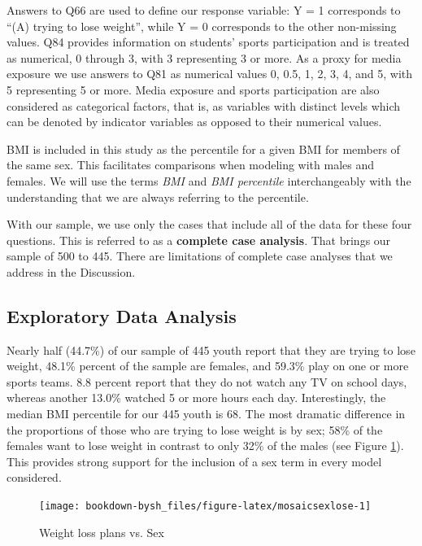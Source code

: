 \documentclass[
]{krantz}
\begin{document}
Answers to Q66 are used to define our response variable: Y = 1 corresponds to ``(A) trying to lose weight'', while Y = 0 corresponds to the other non-missing values. Q84 provides information on students' sports participation and is treated as numerical, 0 through 3, with 3 representing 3 or more. As a proxy for media exposure we use answers to Q81 as numerical values 0, 0.5, 1, 2, 3, 4, and 5, with 5 representing 5 or more. Media exposure and sports participation are also considered as categorical factors, that is, as variables with distinct levels which can be denoted by indicator variables as opposed to their numerical values.

BMI is included in this study as the percentile for a given BMI for members of the same sex. This facilitates comparisons when modeling with males and females. We will use the terms \emph{BMI} and \emph{BMI percentile} interchangeably with the understanding that we are always referring to the percentile.

With our sample, we use only the cases that include all of the data for these four questions. This is referred to as a \textbf{complete case analysis}. That brings our sample of 500 to 445. There are limitations of complete case analyses that we address in the Discussion.

\hypertarget{exploratory-data-analysis-2}{%
\subsection{Exploratory Data Analysis}\label{exploratory-data-analysis-2}}

Nearly half (44.7\%) of our sample of 445 youth report that they are trying to lose weight, 48.1\% percent of the sample are females, and 59.3\% play on one or more sports teams. 8.8 percent report that they do not watch any TV on school days, whereas another 13.0\% watched 5 or more hours each day. Interestingly, the median BMI percentile for our 445 youth is 68. The most dramatic difference in the proportions of those who are trying to lose weight is by sex; 58\% of the females want to lose weight in contrast to only 32\% of the males (see Figure \ref{fig:mosaicsexlose}). This provides strong support for the inclusion of a sex term in every model considered.

\begin{figure}

{\centering \texttt{[image: bookdown-bysh\_files/figure-latex/mosaicsexlose-1]} 

}

\caption{Weight loss plans vs. Sex}\label{fig:mosaicsexlose}
\end{figure}
\end{document}
